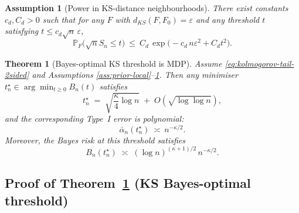 \documentclass[10pt,a4paper]{amsart}
\newtheorem{theorem}{Theorem}
\newtheorem{assumption}{Assumption}
\newcommand{\PP}{\mathbb{P}}
\begin{document}
\begin{assumption}[Power in KS-distance neighbourhoods]\label{ass:detectability}
There exist constants $c_d,C_d>0$ such that for any $F$ with $d_{KS}(F,F_0)=\varepsilon$ and any threshold $t$ satisfying $t\le c_d\sqrt{n}\,\varepsilon$,
\begin{equation}\label{eq:detectability}
\PP_F\!\big(\sqrt{n}S_n\le t\big)
\ \le\
C_d\,\exp\!\big(-c_d\,n\varepsilon^2 + C_d t^2\big).
\end{equation}
\end{assumption}

\begin{theorem}[Bayes-optimal KS threshold is MDP]\label{thm:ks-mdp}
Assume \eqref{eq:kolmogorov-tail-2sided} and Assumptions \ref{ass:prior-local}--\ref{ass:detectability}.
Then any minimiser $t_n^\star\in\arg\min_{t\ge 0} B_n(t)$ satisfies
\begin{equation}\label{eq:optimal-threshold}
t_n^\star \;=\; \sqrt{\frac{\kappa}{4}\log n}\;+\;O(\sqrt{\log\log n}),
\end{equation}
and the corresponding Type~I error is polynomial:
\begin{equation}\label{eq:type1-decay}
\bar\alpha_n(t_n^\star)\ \asymp\ n^{-\kappa/2}.
\end{equation}
Moreover, the Bayes risk at this threshold satisfies
\begin{equation}\label{eq:bayes-risk-rate}
B_n(t_n^\star)
\;\asymp\;
(\log n)^{(\kappa+1)/2}\, n^{-\kappa/2}.
\end{equation}
\end{theorem}

\subsection{Proof of Theorem~\ref{thm:ks-mdp} (KS Bayes-optimal threshold)}\label{app:proof-ks-mdp}
\end{document}
